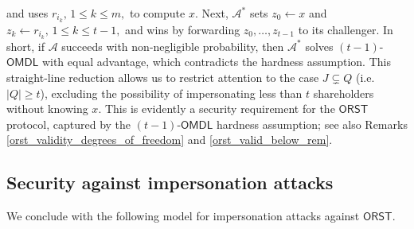 \documentclass{iacrtrans}
\begin{document}
and uses $r_{i_k},\hspace{2pt} 1 \le k \le m,$ to compute $x$.
Next,
$\mathcal{A}^*$ sets $z_0 \leftarrow x$
and $z_k \leftarrow r_{i_k},\hspace{2pt} 1\le k \le t-1,$
and wins by forwarding
$z_0, \dots, z_{t-1}$ to its challenger.
In short, if $\mathcal{A}$ succeeds
with non-negligible probability, then $\mathcal{A}^*$
solves $(t-1)$-$\mathsf{OMDL}$ with equal advantage,
which contradicts the hardness assumption.
This straight-line reduction allows us to restrict attention
to the case $J \subsetneq Q$ (i.e. $|Q| \ge t$),
excluding the possibility of impersonating less than $t$
shareholders without knowing $x$.
This is evidently a security requirement for the $\mathsf{ORST}$
protocol, captured by the $(t-1)$-$\mathsf{OMDL}$
hardness assumption; see also Remarks
\ref{orst_validity_degrees_of_freedom} and
\ref{orst_valid_below_rem}.

\subsection{Security against impersonation attacks}\label{section_security_imp}

\noindent
We conclude with the following model
for impersonation attacks against
$\mathsf{ORST}$.
\end{document}
